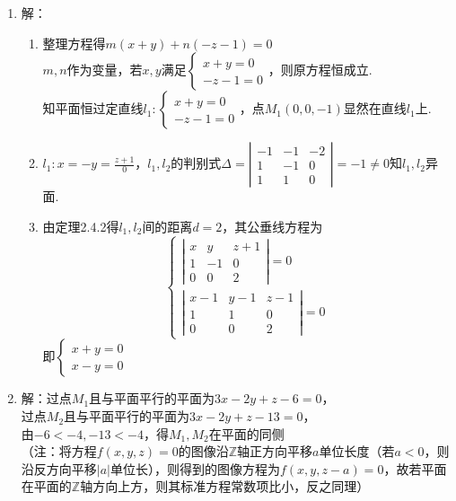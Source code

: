 \documentclass[UTF8]{ctexart}
\begin{document}
\begin{enumerate}
\item 解：\begin{enumerate}[(1)]
\item 整理方程得$m\left(x+y\right)+n\left(-z-1\right)=0$\\
$m,n$作为变量，若$x,y$满足$\left\{\begin{array}{l}x+y=0\\-z-1=0\end{array}\right.$，则原方程恒成立.\\
知平面\uppercase\expandafter{}恒过定直线$l_1:\left\{\begin{array}{l}x+y=0\\-z-1=0\end{array}\right.$，点$M_1\left(0,0,-1\right)$显然在直线$l_1$上.
\item $l_1:x=-y=\displaystyle\frac{z+1}{0}$，$l_1,l_2$的判别式$\Delta=\left|\begin{array}{ccc}-1&-1&-2\\1&-1&0\\1&1&0\end{array}\right|=-1\neq0$知$l_1,l_2$异面.
\item 由定理2.4.2得$l_1,l_2$间的距离$d=2$，其公垂线方程为
$$\left\{\begin{array}{l}\left|\begin{array}{ccc}x&y&z+1\\1&-1&0\\0&0&2\end{array}\right|=0\\
\left|\begin{array}{ccc}x-1&y-1&z-1\\1&1&0\\0&0&2\end{array}\right|=0\end{array}\right.$$
即$\left\{\begin{array}{l}x+y=0\\x-y=0\end{array}\right.$
\end{enumerate}

\item 解：过点$M_1$且与平面\uppercase\expandafter{}平行的平面\uppercase\expandafter{}为$3x-2y+z-6=0$，\\
过点$M_2$且与平面\uppercase\expandafter{}平行的平面\uppercase\expandafter{}为$3x-2y+z-13=0$，\\
由$-6<-4,-13<-4$，得$M_1,M_2$在平面\uppercase\expandafter{}的同侧\\
（注：将方程$f\left(x,y,z\right)=0$的图像沿$\mathbb{Z}$轴正方向平移$a$单位长度（若$a<0$，则沿反方向平移$\left|a\right|$单位长），则得到的图像方程为$f\left(x,y,z-a\right)=0$，故若平面在平面\uppercase\expandafter{}的$\mathbb{Z}$轴方向上方，则其标准方程常数项比\uppercase\expandafter{}小，反之同理）


\end{enumerate}
\end{document}
